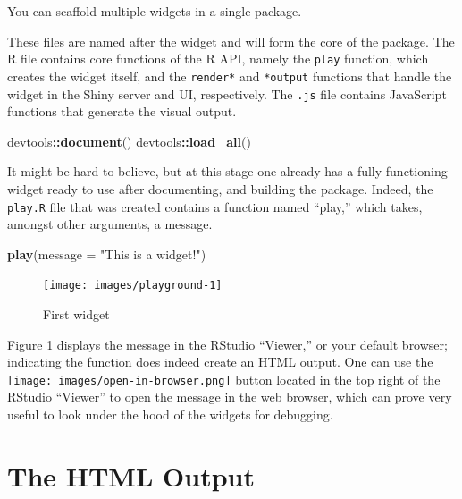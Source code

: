 \documentclass[10pt,]{krantz}
\makeatletter
\newenvironment{Shaded}{\begin{snugshade}}{\end{snugshade}}
\newcommand{\DataTypeTok}[1]{\textcolor[rgb]{0.27,0.27,0.27}{#1}}
\newcommand{\KeywordTok}[1]{\textcolor[rgb]{0.27,0.27,0.27}{\textbf{#1}}}
\newcommand{\NormalTok}[1]{#1}
\newcommand{\OperatorTok}[1]{\textcolor[rgb]{0.43,0.43,0.43}{\textbf{#1}}}
\newcommand{\StringTok}[1]{\textcolor[rgb]{0.5,0.5,0.5}{#1}}
\newenvironment{kframe}{%
\medskip{}
\setlength{\fboxsep}{.8em}
 \def\at@end@of@kframe{}%
 \ifinner\ifhmode%
  \def\at@end@of@kframe{\end{minipage}}%
  \begin{minipage}{\columnwidth}%
 \fi\fi%
 \def\FrameCommand##1{\hskip\@totalleftmargin \hskip-\fboxsep
 \colorbox{shadecolor}{##1}\hskip-\fboxsep
     \hskip-\linewidth \hskip-\@totalleftmargin \hskip\columnwidth}%
 \MakeFramed {\advance\hsize-\width
   \@totalleftmargin\z@ \linewidth\hsize
   \@setminipage}}%
 {\par\unskip\endMakeFramed%
 \at@end@of@kframe}
\renewenvironment{Shaded}{\begin{kframe}}{\end{kframe}}
\newenvironment{rmdblock}[1]
  {
  \begin{itemize}
  \renewcommand{\labelitemi}{
    \raisebox{-.7\height}[0pt][0pt]{
      {\setkeys{Gin}{width=3em,keepaspectratio}\texttt{[image: images/\#1]}}
    }
  }
  \setlength{\fboxsep}{1em}
  \begin{kframe}
  \item
  }
  {
  \end{kframe}
  \end{itemize}
  }
\newenvironment{rmdnote}
  {\begin{rmdblock}{note}}
  {\end{rmdblock}}
\makeatother
\begin{document}
\begin{rmdnote}
You can scaffold multiple widgets in a single package.
\end{rmdnote}

These files are named after the widget and will form the core of the package. The R file contains core functions of the R API, namely the \texttt{play} function, which creates the widget itself, and the \texttt{render*} and \texttt{*output} functions that handle the widget in the Shiny server and UI, respectively. The \texttt{.js} file contains JavaScript functions that generate the visual output.

\begin{Shaded}
\begin{Highlighting}[]
\NormalTok{devtools}\OperatorTok{::}\KeywordTok{document}\NormalTok{()}
\NormalTok{devtools}\OperatorTok{::}\KeywordTok{load_all}\NormalTok{()}
\end{Highlighting}
\end{Shaded}

It might be hard to believe, but at this stage one already has a fully functioning widget ready to use after documenting, and building the package. Indeed, the \texttt{play.R} file that was created contains a function named ``play,'' which takes, amongst other arguments, a message.

\begin{Shaded}
\begin{Highlighting}[]
\KeywordTok{play}\NormalTok{(}\DataTypeTok{message =} \StringTok{"This is a widget!"}\NormalTok{)}
\end{Highlighting}
\end{Shaded}

\begin{figure}[H]

{\centering \texttt{[image: images/playground-1]} 

}

\caption{First widget}\label{fig:playground-1}
\end{figure}

Figure \ref{fig:playground-1} displays the message in the RStudio ``Viewer,'' or your default browser; indicating the function does indeed create an HTML output. One can use the \texttt{[image: images/open-in-browser.png]} button located in the top right of the RStudio ``Viewer'' to open the message in the web browser, which can prove very useful to look under the hood of the widgets for debugging.

\hypertarget{widgets-first-htmloutput}{%
\section{The HTML Output}\label{widgets-first-htmloutput}}
\end{document}
